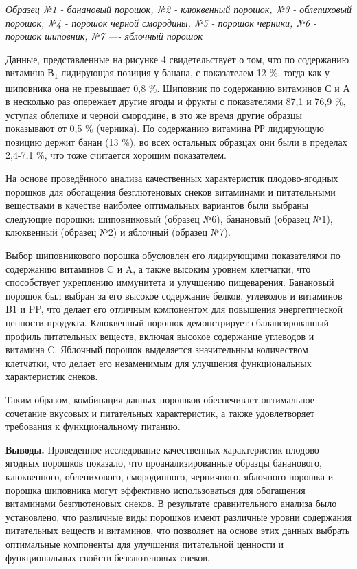 \begin{multicols}{2}
\emph{Образец №1 - банановый порошок, №2 - клюквенный порошок, №3 -
облепиховый порошок, №4 - порошок черной смородины, №5 - порошок
черники, №6 - порошок шиповник, №7 ---\/- яблочный порошок}

Данные, представленные на рисунке 4 свидетельствует о том, что по
содержанию витамина В\textsubscript{1} лидирующая позиция у банана, с
показателем 12 \%, тогда как у шиповника она не превышает 0,8 \%.
Шиповник по содержанию витаминов С и А в несколько раз опережает другие
ягоды и фрукты с показателями 87,1 и 76,9 \%, уступая облепихе и черной
смородине, в это же время другие образцы показывают от 0,5 \% (черника).
По содержанию витамина РР лидирующую позицию держит банан (13 \%), во
всех остальных образцах они были в пределах 2,4-7,1 \%, что тоже
считается хорощим показателем.

На основе проведённого анализа качественных характеристик
плодово-ягодных порошков для обогащения безглютеновых снеков витаминами
и питательными веществами в качестве наиболее оптимальных вариантов были
выбраны следующие порошки: шиповниковый (образец №6), банановый (образец
№1), клюквенный (образец №2) и яблочный (образец №7).

Выбор шиповникового порошка обусловлен его лидирующими показателями по
содержанию витаминов C и A, а также высоким уровнем клетчатки, что
способствует укреплению иммунитета и улучшению пищеварения. Банановый
порошок был выбран за его высокое содержание белков, углеводов и
витаминов B1 и PP, что делает его отличным компонентом для повышения
энергетической ценности продукта. Клюквенный порошок демонстрирует
сбалансированный профиль питательных веществ, включая высокое содержание
углеводов и витамина C. Яблочный порошок выделяется значительным
количеством клетчатки, что делает его незаменимым для улучшения
функциональных характеристик снеков.

Таким образом, комбинация данных порошков обеспечивает оптимальное
сочетание вкусовых и питательных характеристик, а также удовлетворяет
требования к функциональному питанию.

{\bfseries Выводы.} Проведенное исследование качественных характеристик
плодово-ягодных порошков показало, что проанализированные образцы
бананового, клюквенного, облепихового, смородинного, черничного,
яблочного порошка и порошка шиповника могут эффективно использоваться
для обогащения витаминами безглютеновых снеков. В результате
сравнительного анализа было установлено, что различные виды порошков
имеют различные уровни содержания питательных веществ и витаминов, что
позволяет на основе этих данных выбрать оптимальные компоненты для
улучшения питательной ценности и функциональных свойств безглютеновых
снеков.


\end{multicols}
